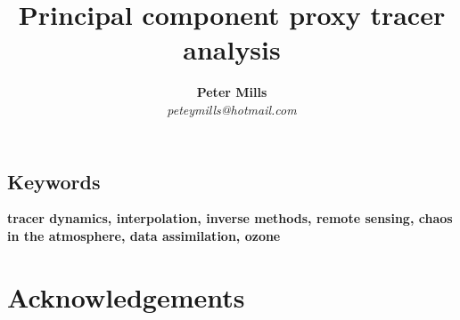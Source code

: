 \documentclass[12pt]{article}
\begin{document}
\title{Principal component proxy tracer analysis}

\author{\textbf{Peter Mills}\\
\textit{peteymills@hotmail.com}}

\maketitle



\vspace{0.5cm}


\begin{abstract}

\end{abstract}

\subsection*{Keywords}
\textbf{tracer dynamics,
interpolation,
inverse methods,
remote sensing,
chaos in the atmosphere,
data assimilation,
ozone}






\section*{Acknowledgements}




\end{document}
